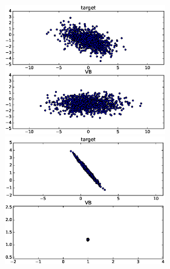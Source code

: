 \documentclass[a4j]{jarticle}
\begin{document}
\includegraphics[width=7cm]{fig_1.eps}
\includegraphics[width=7cm]{fig_2.eps}


\end{document}
